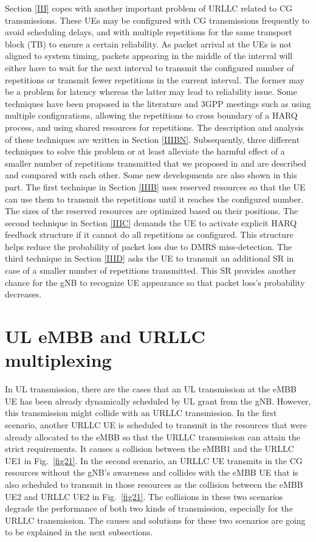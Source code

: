 \documentclass{ieeeaccess}
\begin{document}
Section \ref{III} copes with another important problem of URLLC related to CG transmissions. These UEs may be configured with CG transmissions frequently to avoid scheduling delays, and with multiple repetitions for the same transport block (TB) to ensure a certain reliability. As packet arrival at the UEs is not aligned to system timing, packets appearing in the middle of the interval will either have to wait for the next interval to transmit the configured number of repetitions or transmit fewer repetitions in the current interval. The former may be a problem for latency whereas the latter may lead to reliability issue. Some techniques have been proposed in the literature and 3GPP meetings such as using multiple configurations, allowing the repetitions to cross boundary of a HARQ process, and using shared resources for repetitions. The description and analysis of these techniques are written in Section \ref{IIIBN}. Subsequently, three different techniques to solve this problem or at least alleviate the harmful effect of a smaller number of repetitions transmitted that we proposed in \cite{b9} and \cite{ad100} are described and compared with each other. Some new developments are also shown in this part. The first technique in Section \ref{IIIB} uses reserved resources so that the UE can use them to transmit the repetitions until it reaches the configured number. The sizes of the reserved resources are optimized based on their positions. The second technique in Section \ref{IIIC} demands the UE to activate explicit HARQ feedback structure if it cannot do all repetitions as configured. This structure helps reduce the probability of packet loss due to DMRS miss-detection. The third technique in Section \ref{IIID} asks the UE to transmit an additional SR in case of a smaller number of repetitions transmitted. This SR provides another chance for the gNB to recognize UE appearance so that packet loss's probability decreases. 

\section{UL eMBB and URLLC multiplexing}\label{II}

In UL transmission, there are the cases that an UL transmission at the eMBB UE has been already dynamically scheduled by UL grant from the gNB. However, this transmission might collide with an URLLC transmission. In the first scenario, another URLLC UE is scheduled to transmit in the resources that were already allocated to the eMBB so that the URLLC transmission can attain the strict requirements. It causes a collision between the eMBB1 and the URLLC UE1 in Fig.~\ref{fig21}. In the second scenario, an URLLC UE transmits in the CG resources without the gNB's awareness and collides with the eMBB UE that is also scheduled to transmit in those resources as the collision between the eMBB UE2 and URLLC UE2 in Fig.~\ref{fig21}. The collisions in these two scenarios degrade the performance of both two kinds of transmission, especially for the URLLC transmission. The causes and solutions for these two scenarios are going to be explained in the next subsections.
\end{document}

